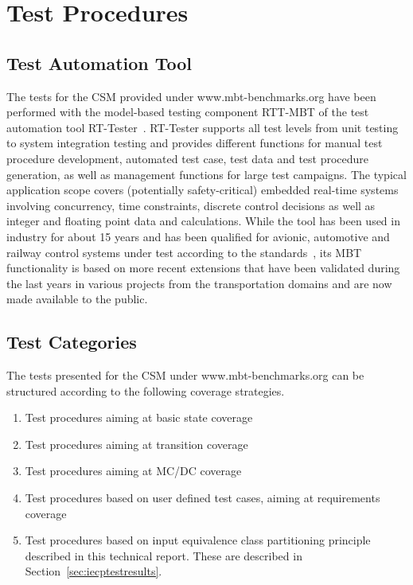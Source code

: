 \newpage
\section{Test Procedures}\label{sec:conventionaltests}


\subsection{Test Automation Tool}

The tests for the CSM provided under www.mbt-benchmarks.org have been performed with the model-based testing component RTT-MBT of the test automation tool RT-Tester~\cite{EPTCS111.1}.
RT-Tester supports all test levels from unit testing to system
integration testing and provides different functions  for manual test
procedure development, automated test case, test data and test procedure
generation, as well as management functions
for large test campaigns. The typical application scope covers (potentially
safety-critical) embedded real-time
systems involving concurrency, time constraints, discrete control decisions as
well as integer and floating point data and calculations. While the tool has
been used in industry for about 15 years and has been qualified for avionic, automotive and railway 
control systems under test according to the standards~\cite{do178b,iso26262-4,CENELEC50128}, its MBT functionality is based on more recent extensions that have been validated during the
last years in various projects from the transportation domains and are  
now made available to the public.

\subsection{Test Categories}

The tests presented for the CSM under www.mbt-benchmarks.org can be structured according to the following coverage strategies. 
\begin{enumerate}
  \item Test procedures aiming at  basic state coverage
  \item Test procedures aiming at    transition coverage
  \item Test procedures aiming at   MC/DC coverage
  \item Test procedures based on  user defined test cases, aiming at requirements coverage
  \item Test procedures based on input equivalence class partitioning principle described in this technical report. These are described in Section~\ref{sec:iecptestresults}.
\end{enumerate}


